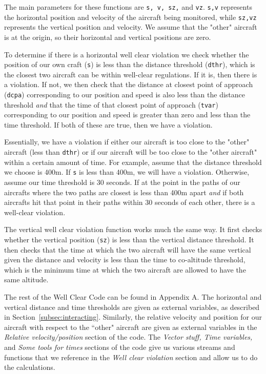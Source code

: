 The main parameters for these functions are {\tt s, v, sz,} and {\tt vz}. {\tt s,v} represents the horizontal position and velocity of the aircraft being monitored, while {\tt sz,vz} represents the vertical position and velocity. We assume that the "other" aircraft is at the origin, so their horizontal and vertical positions are zero. 

To determine if there is a horizontal well clear violation we check whether the position of our own craft ({\tt s}) is less than the distance threshold ({\tt dthr}), which is the closest two aircraft can be within well-clear regulations. If it is, then there is a violation. If not, we then check that the distance at closest point of approach ({\tt dcpa}) corresponding to our position and speed is also less than the distance threshold \emph{and} that the time of that closest point of approach ({\tt tvar}) corresponding to our position and speed is greater than zero and less than the time threshold. If both of these are true, then we have a violation. 

Essentially, we have a violation if either our aircraft is too close to the "other" aircraft (less than {\tt dthr}) or if our aircraft will be too close to the "other aircraft" within a certain amount of time. For example, assume that the distance threshold we choose is 400m. If {\tt s} is less than 400m, we will have a violation. Otherwise, assume our time threshold is 30 seconds. If at the point in the paths of our aircrafts where the two paths are closest is less than 400m apart \emph{and} if both aircrafts hit that point in their paths within 30 seconds of each other, there is a well-clear violation. 

The vertical well clear violation function works much the same way. It first checks whether the vertical position ({\tt sz}) is less than the vertical distance threshold. It then checks that the time at which the two aircraft will have the same vertical given the distance and velocity is less than the time to co-altitude threshold, which is the minimum time at which the two aircraft are allowed to have the same altitude. 

The rest of the Well Clear Code can be found in Appendix A. The horizontal and vertical distance and time thresholds are given as external variables, as described in Section~\ref{subsec:interacting}. Similarly, the relative velocity and position for our aircraft with respect to the ``other" aircraft are given as external variables in the \emph{Relative velocity/position} section of the code. The \emph{Vector stuff, Time variables,} and \emph{Some tools for times} sections of the code give us various streams and functions that we reference in the \emph{Well clear violation} section and allow us to do the calculations. 

